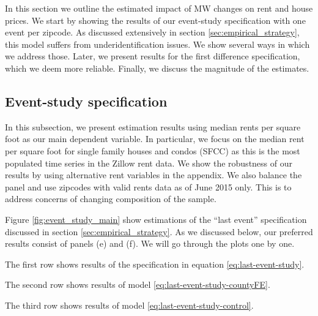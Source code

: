 
    In this section we outline the estimated impact of MW changes on rent and house prices. We start by showing the results of our event-study specification with one event per zipcode. As discussed extensively in section \autoref{sec:empirical_strategy}, this model suffers from underidentification issues. We show several ways in which we address those. Later, we present results for the first difference specification, which we deem more reliable. Finally, we discuss the magnitude of the estimates.


\subsection{Event-study specification}\label{subsec:results/event-study}

    In this subsection, we present estimation results using median rents per square foot as our main dependent variable. In particular, we focus on the median rent per square foot for single family houses and condos (SFCC) as this is the most populated time series in the Zillow rent data. We show the robustness of our results by using alternative rent variables in the appendix. 
    We also balance the panel and use zipcodes with valid rents data as of June 2015 only. This is to address concerns of changing composition of the sample.
    
    Figure \ref{fig:event_study_main} show estimations of the ``last event'' specification discussed in section \ref{sec:empirical_strategy}. As we discussed below, our preferred results consist of panels (e) and (f). We will go through the plots one by one. 
    
    The first row shows results of the specification in equation \eqref{eq:last-event-study}.
    
    The second row shows results of model \eqref{eq:last-event-study-countyFE}.
    
    The third row shows results of model \eqref{eq:last-event-study-control}.
    
